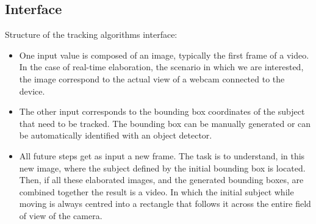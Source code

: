 \subsection{Interface}
Structure of the tracking algorithms interface:
\begin{itemize}
	\item One input value is composed of an image, typically the first frame of a video. In the case of real-time elaboration, the scenario in which we are interested, the image correspond to the actual view of a webcam connected to the device.
	\item The other input corresponds to the bounding box coordinates of the subject that need to be tracked. The bounding box can be manually generated or can be automatically identified with an object detector.
	\item All future steps get as input a new frame. The task is to understand, in this new image, where the subject defined by the initial bounding box is located.\\
	Then, if all these elaborated images, and the generated bounding boxes, are combined together the result is a video. In which the initial subject while moving is always centred into a rectangle that follows it across the entire field of view of the camera.
\end{itemize}


